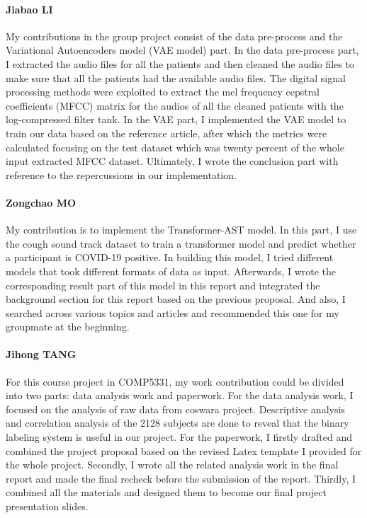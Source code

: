 \documentclass[11pt]{article}
\begin{document}
\paragraph{Jiabao LI}

My contributions in the group project consist of the data pre-process and the Variational 
Autoencoders model (VAE model) part. In the data pre-process part, I extracted the audio 
files for all the patients and then cleaned the audio files to make sure that 
all the patients had the available audio files. The digital signal processing methods 
were exploited to extract the mel frequency cepstral coefficients (MFCC) matrix for the audios 
of all the cleaned patients with the log-compressed filter tank. In the VAE part, 
I implemented the VAE model to train our data based on the reference article, 
after which the metrics were calculated focusing on the test dataset which was twenty 
percent of the whole input extracted MFCC dataset. Ultimately, I wrote the conclusion part 
with reference to the repercussions in our implementation.

\paragraph{Zongchao MO}

My contribution is to implement the Transformer-AST model. In this part, 
I use the cough sound track dataset to train a transformer model and predict 
whether a participant is COVID-19 positive. In building this model, I tried different 
models that took different formats of data as input. Afterwards, I wrote the corresponding 
result part of this model in this report and integrated the background section for this 
report based on the previous proposal. And also, I searched across various topics and 
articles and recommended this one for my groupmate at the beginning. 

\paragraph{Jihong TANG}

For this course project in COMP5331, my work contribution could be divided into two parts: 
data analysis work and paperwork. For the data analysis work, I focused on the 
analysis of raw data from coswara project. Descriptive analysis and correlation analysis 
of the 2128 subjects are done to reveal that the binary labeling system is useful in our project. 
For the paperwork, I firstly drafted and combined the project proposal based on the revised 
Latex template I provided for the whole project. Secondly, I wrote all the related analysis 
work in the final report and made the final recheck before the submission of the report. 
Thirdly, I combined all the materials and designed them to become our final project presentation slides. 
\end{document}
